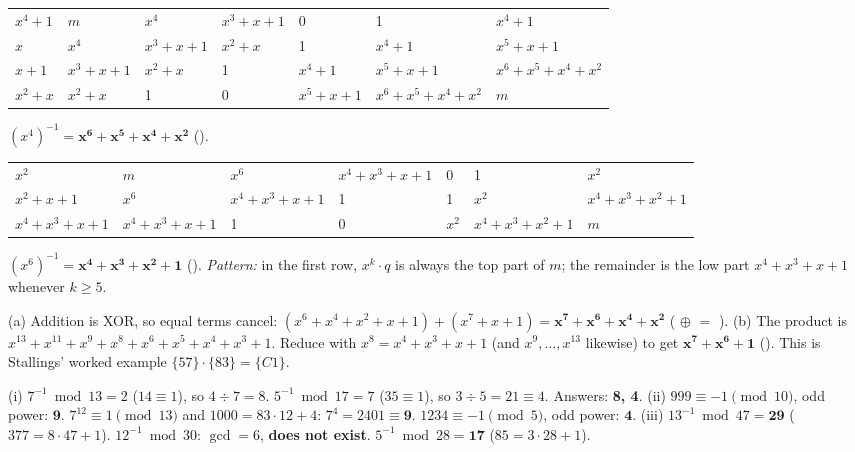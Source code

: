 \da
\begin{center}\small\setlength{\tabcolsep}{3pt}
\begin{tabular}{@{}lllllll@{}}
\toprule
$x^4{+}1$ & $m$ & $x^4$ & $x^3{+}x{+}1$ & 0 & 1 & $x^4{+}1$\\
$x$ & $x^4$ & $x^3{+}x{+}1$ & $x^2{+}x$ & 1 & $x^4{+}1$ & $x^5{+}x{+}1$\\
$x{+}1$ & $x^3{+}x{+}1$ & $x^2{+}x$ & 1 & $x^4{+}1$ & $x^5{+}x{+}1$ & $x^6{+}x^5{+}x^4{+}x^2$\\
$x^2{+}x$ & $x^2{+}x$ & 1 & 0 & $x^5{+}x{+}1$ & $x^6{+}x^5{+}x^4{+}x^2$ & $m$\\
\bottomrule
\end{tabular}
\end{center}
$(x^4)^{-1} = \mathbf{x^6 + x^5 + x^4 + x^2}$ ().

\da
\begin{center}\small\setlength{\tabcolsep}{3pt}
\begin{tabular}{@{}lllllll@{}}
\toprule
$x^2$ & $m$ & $x^6$ & $x^4{+}x^3{+}x{+}1$ & 0 & 1 & $x^2$\\
$x^2{+}x{+}1$ & $x^6$ & $x^4{+}x^3{+}x{+}1$ & 1 & 1 & $x^2$ & $x^4{+}x^3{+}x^2{+}1$\\
$x^4{+}x^3{+}x{+}1$ & $x^4{+}x^3{+}x{+}1$ & 1 & 0 & $x^2$ & $x^4{+}x^3{+}x^2{+}1$ & $m$\\
\bottomrule
\end{tabular}
\end{center}
$(x^6)^{-1} = \mathbf{x^4 + x^3 + x^2 + 1}$ ().
\emph{Pattern:} in the first row, $x^k \cdot q$ is always the top part of $m$; the remainder is the low part $x^4{+}x^3{+}x{+}1$ whenever $k \ge 5$.

\da (a) Addition is XOR, so equal terms cancel: $(x^6{+}x^4{+}x^2{+}x{+}1) + (x^7{+}x{+}1) = \mathbf{x^7 + x^6 + x^4 + x^2}$ ( $\oplus$  $=$ ).
(b) The product is $x^{13}{+}x^{11}{+}x^9{+}x^8{+}x^6{+}x^5{+}x^4{+}x^3{+}1$. Reduce with $x^8 = x^4{+}x^3{+}x{+}1$ (and $x^9, \dots, x^{13}$ likewise) to get $\mathbf{x^7 + x^6 + 1}$ (). This is Stallings' worked example $\{57\}\cdot\{83\} = \{C1\}$.

\da (i) $7^{-1} \bmod 13 = 2$ ($14 \equiv 1$), so $4 \div 7 = 8$. \;$5^{-1} \bmod 17 = 7$ ($35 \equiv 1$), so $3 \div 5 = 21 \equiv 4$. Answers: \textbf{8, 4}.
(ii) $999 \equiv -1 \pmod{10}$, odd power: $\mathbf{9}$. \;$7^{12} \equiv 1 \pmod{13}$ and $1000 = 83\cdot12 + 4$: $7^4 = 2401 \equiv \mathbf{9}$. \;$1234 \equiv -1 \pmod 5$, odd power: $\mathbf{4}$.
(iii) $13^{-1} \bmod 47 = \mathbf{29}$ ($377 = 8\cdot47 + 1$). $12^{-1} \bmod 30$: $\gcd = 6$, \textbf{does not exist}. $5^{-1} \bmod 28 = \mathbf{17}$ ($85 = 3\cdot28 + 1$).

